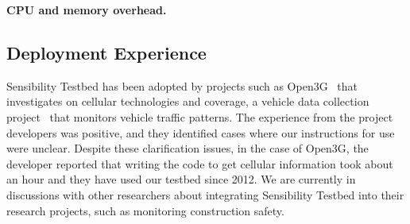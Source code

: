 %
%
%
%
%
%
%


\textbf{CPU and memory overhead.}

\subsection{Deployment Experience}\label{sec-deployment}



Sensibility Testbed has been adopted by projects such as 
Open3G~\cite{open3g} that investigates on cellular technologies 
and coverage, a vehicle data collection project~\cite{reininger2015first} 
that monitors vehicle traffic patterns. The experience from the 
project developers was positive, and they identified cases where our 
instructions for use were unclear. Despite these clarification issues, in 
the case of Open3G, the developer reported that writing the code to
get cellular information took about an hour and they have used our
testbed since 2012. We are currently in discussions with other 
researchers about integrating Sensibility Testbed into their research
projects, such as monitoring construction safety.

